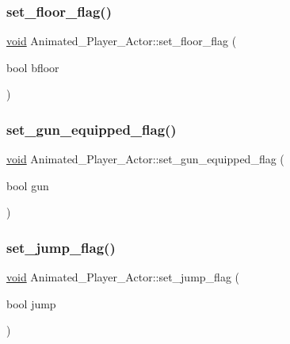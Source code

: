 \subsubsection{\texorpdfstring{set\+\_\+floor\+\_\+flag()}{set\_floor\_flag()}}
{\footnotesize\ttfamily \hyperlink{imgui__impl__opengl3__loader_8h_ac668e7cffd9e2e9cfee428b9b2f34fa7}{void} Animated\+\_\+\+Player\+\_\+\+Actor\+::set\+\_\+floor\+\_\+flag (\begin{DoxyParamCaption}\item[{bool}]{bfloor }\end{DoxyParamCaption})\hspace{0.3cm}{\ttfamily [inline]}}

\mbox{\label{classAnimated__Player__Actor_a6e291bd8d34967d94386067affd48998}} 
\subsubsection{\texorpdfstring{set\+\_\+gun\+\_\+equipped\+\_\+flag()}{set\_gun\_equipped\_flag()}}
{\footnotesize\ttfamily \hyperlink{imgui__impl__opengl3__loader_8h_ac668e7cffd9e2e9cfee428b9b2f34fa7}{void} Animated\+\_\+\+Player\+\_\+\+Actor\+::set\+\_\+gun\+\_\+equipped\+\_\+flag (\begin{DoxyParamCaption}\item[{bool}]{gun }\end{DoxyParamCaption})\hspace{0.3cm}{\ttfamily [inline]}}

\mbox{\label{classAnimated__Player__Actor_a7e0fb150e4e6a0a588b126a7251b059d}} 
\subsubsection{\texorpdfstring{set\+\_\+jump\+\_\+flag()}{set\_jump\_flag()}}
{\footnotesize\ttfamily \hyperlink{imgui__impl__opengl3__loader_8h_ac668e7cffd9e2e9cfee428b9b2f34fa7}{void} Animated\+\_\+\+Player\+\_\+\+Actor\+::set\+\_\+jump\+\_\+flag (\begin{DoxyParamCaption}\item[{bool}]{jump }\end{DoxyParamCaption})\hspace{0.3cm}{\ttfamily [inline]}}

